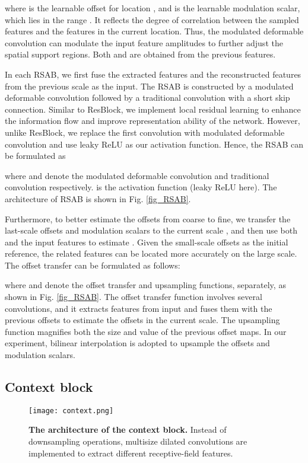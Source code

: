 \documentclass[runningheads]{llncs}
\begin{document}
where  is the learnable offset for location , and  is the learnable modulation scalar, which lies in the range . It reflects the degree of correlation between the sampled features  and the features in the current location. Thus, the modulated deformable convolution can modulate the input feature amplitudes to further adjust the spatial support regions. Both  and  are obtained from the previous features. 

In each RSAB, we first fuse the extracted features and the reconstructed features from the previous scale as the input. The RSAB is constructed by a modulated deformable convolution followed by a traditional convolution with a short skip connection. Similar to ResBlock, we implement local residual learning to enhance the information flow and improve representation ability of the network. However, unlike ResBlock, we replace the first convolution with modulated deformable convolution and use leaky ReLU as our activation function. Hence, the RSAB can be formulated as

where  and  denote the modulated deformable convolution and traditional convolution respectively.  is the activation function (leaky ReLU here). The architecture of RSAB is shown in Fig. \ref{fig_RSAB}.

Furthermore, to better estimate the offsets from coarse to fine, we transfer the last-scale offsets  and modulation scalars  to the current scale , and then use both  and the input features  to estimate . Given the small-scale offsets as the initial reference, the related features can be located more accurately on the large scale. The offset transfer can be formulated as follows:

where  and  denote the offset transfer and upsampling functions, separately, as shown in Fig. \ref{fig_RSAB}. The offset transfer function involves several convolutions, and it extracts features from input and fuses them with the previous offsets to estimate the offsets in the current scale. The upsampling function magnifies both the size and value of the previous offset maps. In our experiment, bilinear interpolation is adopted to upsample the offsets and modulation scalars.

\subsection{Context block}

\begin{figure}[t]
\begin{center}
\texttt{[image: context.png]}
\end{center}
\setlength{\abovecaptionskip}{0.cm}
   \caption{\textbf{The architecture of the context block.} Instead of downsampling operations, multisize dilated convolutions are implemented to extract different receptive-field features.}
\label{fig_context}
\end{figure}
\end{document}
